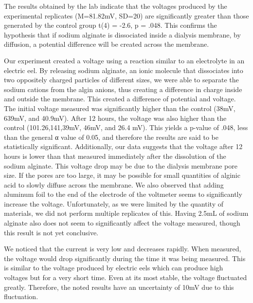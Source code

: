 \documentclass[letterpaper]{article}
\begin{document}
The results obtained by the lab indicate that the voltages produced by the experimental replicates (M=81.82mV, SD=20) are significantly greater than those generated by the control group t(4) = -2.6, p = .048. This confirms the hypothesis that if sodium alginate is dissociated inside a dialysis membrane, by diffusion, a potential difference will be created across the membrane.

Our experiment created a voltage using a reaction similar to an electrolyte in an electric eel. By releasing sodium alginate, an ionic molecule that dissociates into two oppositely charged particles of different sizes, we were able to separate the sodium cations from the algin anions, thus creating a difference in charge inside and outside the membrane. This created a difference of potential and voltage. The initial voltage measured was significantly higher than the control (38mV, 639mV, and 40.9mV). After 12 hours, the voltage was also higher than the control (101.26,141,39mV, 46mV, and 26.4 mV). This yields a p-value of .048, less than the general α value of 0.05, and therefore the results are said to be statistically significant. Additionally, our data suggests that the voltage after 12 hours is lower than that measured immediately after the dissolution of the sodium alginate. This voltage drop may be due to the dialysis membrane pore size. If the pores are too large, it may be possible for small quantities of alginic acid to slowly diffuse across the membrane. We also observed that adding aluminum foil to the end of the electrode of the voltmeter seems to significantly increase the voltage. Unfortunately, as we were limited by the quantity of materials, we did not perform multiple replicates of this. Having 2.5mL of sodium alginate also does not seem to significantly affect the voltage measured, though this result is not yet conclusive.

We noticed that the current is very low and decreases rapidly. When measured, the voltage would drop significantly during the time it was being measured. This is similar to the voltage produced by electric eels which can produce high voltages but for a very short time. Even at its most stable, the voltage fluctuated greatly. Therefore, the noted results have an uncertainty of \pm 10mV due to this fluctuation.
\end{document}
